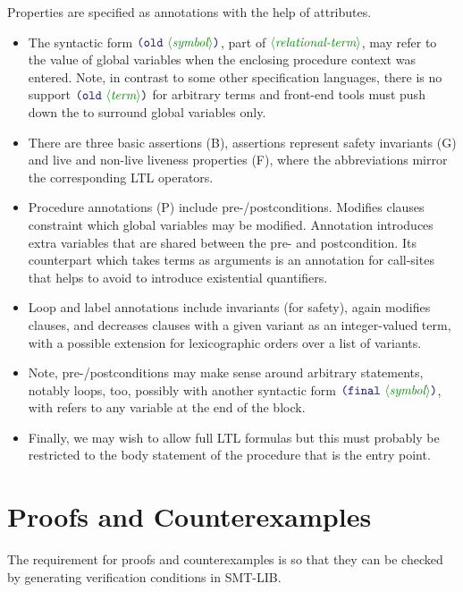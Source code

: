 \documentclass[runningheads]{llncs}
\begin{document}
\noindent
Properties are specified as annotations with the help of attributes.
\begin{itemize}
\item The syntactic form $\LP\terminal{old}~\nonterminal{symbol}\RP$,
      part of $\nonterminal{relational-term}$,
      may refer to the value of global variables
      when the enclosing procedure context was entered.
      Note, in contrast to some other specification languages,
      there is no support $\LP\terminal{old}~\nonterminal{term}\RP$
      for arbitrary terms and front-end tools must push down
      the  to surround global variables only.
\item There are three basic assertions (B), assertions represent safety invariants (G)
      and live and non-live liveness properties (F),
      where the abbreviations mirror the corresponding LTL operators.
\item Procedure annotations (P) include pre-/postconditions.
      Modifies clauses constraint which global variables may be modified.
      Annotation  introduces extra variables that are 
      shared between the pre- and postcondition.
      Its counterpart which takes terms as arguments is an annotation
      for call-sites that helps to avoid to introduce existential quantifiers.
\item Loop and label annotations include invariants (for safety),
      again modifies clauses,
      and decreases clauses with a given variant as an integer-valued term,
      with a possible extension for lexicographic orders
      over a list of variants.
\item Note, pre-/postconditions may make sense around arbitrary statements,
      notably loops,
      too, possibly with another syntactic form $\LP\terminal{final}~\nonterminal{symbol}\RP$,
      with refers to any variable at the end of the block.
\item Finally, we may wish to allow full LTL formulas
      but this must probably be restricted to the body statement
      of the procedure that is the entry point.
\end{itemize}

\section{Proofs and Counterexamples}

The requirement for proofs and counterexamples is so that
they can be checked by generating verification conditions in SMT-LIB.
\end{document}
